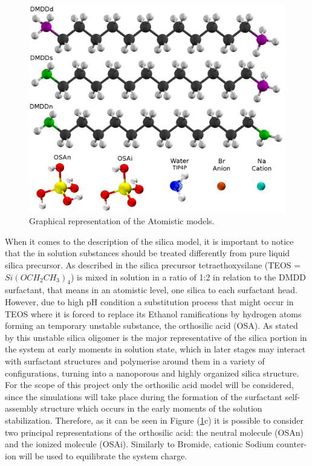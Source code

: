 \documentclass[10pt,a4paper,twoside]{article}
\begin{document}
   \begin{figure}[ht!]
  \begin{center}
	\includegraphics[width=1\textwidth]{./images/molsAA}
	\caption{Graphical representation of the Atomistic models.}
	\label{Fig:atomistic}
  \end{center}
\end{figure}

When it comes to the description of the silica model, it is important to notice that the in solution substances should be treated differently from pure liquid silica precursor. As described in \cite{msuv} the silica precursor tetraethoxysilane (TEOS = $Si(OCH_2CH_3)_4$) is mixed in solution in a ratio of 1:2 in relation to the DMDD surfactant, that means in an atomistic level, one silica to each surfactant head.  However, due to high pH condition a substitution process that might occur in TEOS where it is forced to replace its Ethanol ramifications by hydrogen atoms forming an temporary unstable substance, the orthosilic acid (OSA). As stated by \cite{mjsilica} this unstable silica oligomer is the major representative of the silica portion in the system at early moments in solution state, which in later stages may interact with surfactant structures and polymerise around them in a variety of configurations, turning into a nanoporous and highly organized silica structure. For the scope of this project only the orthosilic acid model will be considered, since the simulations will take place during the formation of the surfactant self-assembly structure which occurs in the early moments of the solution stabilization. Therefore, as it can be seen in Figure (\ref{Fig:atomistic}c) it is possible to consider two principal representations of the orthosilic acid: the neutral molecule (OSAn) and the ionized molecule (OSAi). Similarly to Bromide, cationic Sodium counter-ion will be used to equilibrate the system charge.
\end{document}
